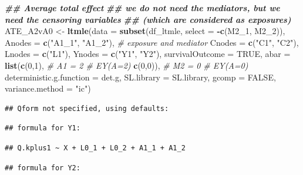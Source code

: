 \documentclass[
]{book}
\newenvironment{Shaded}{\begin{snugshade}}{\end{snugshade}}
\newcommand{\AttributeTok}[1]{\textcolor[rgb]{0.13,0.29,0.53}{#1}}
\newcommand{\CommentTok}[1]{\textcolor[rgb]{0.56,0.35,0.01}{\textit{#1}}}
\newcommand{\ConstantTok}[1]{\textcolor[rgb]{0.56,0.35,0.01}{#1}}
\newcommand{\DecValTok}[1]{\textcolor[rgb]{0.00,0.00,0.81}{#1}}
\newcommand{\DocumentationTok}[1]{\textcolor[rgb]{0.56,0.35,0.01}{\textbf{\textit{#1}}}}
\newcommand{\FunctionTok}[1]{\textcolor[rgb]{0.13,0.29,0.53}{\textbf{#1}}}
\newcommand{\NormalTok}[1]{#1}
\newcommand{\OtherTok}[1]{\textcolor[rgb]{0.56,0.35,0.01}{#1}}
\newcommand{\SpecialCharTok}[1]{\textcolor[rgb]{0.81,0.36,0.00}{\textbf{#1}}}
\newcommand{\StringTok}[1]{\textcolor[rgb]{0.31,0.60,0.02}{#1}}
\begin{document}
\begin{Shaded}
\begin{Highlighting}[]
\DocumentationTok{\#\# Average total effect}
\DocumentationTok{\#\# we do not need the mediators, but we need the censoring variables}
\DocumentationTok{\#\# (which are considered as exposures)}
\NormalTok{ATE\_A2vA0 }\OtherTok{\textless{}{-}} \FunctionTok{ltmle}\NormalTok{(}\AttributeTok{data =} \FunctionTok{subset}\NormalTok{(df\_ltmle, }\AttributeTok{select =} \SpecialCharTok{{-}}\FunctionTok{c}\NormalTok{(M2\_1, M2\_2)),}
                      \AttributeTok{Anodes =} \FunctionTok{c}\NormalTok{(}\StringTok{"A1\_1"}\NormalTok{, }\StringTok{"A1\_2"}\NormalTok{), }\CommentTok{\# exposure and mediator}
                      \AttributeTok{Cnodes =} \FunctionTok{c}\NormalTok{(}\StringTok{"C1"}\NormalTok{, }\StringTok{"C2"}\NormalTok{),}
                      \AttributeTok{Lnodes =} \FunctionTok{c}\NormalTok{(}\StringTok{"L1"}\NormalTok{),}
                      \AttributeTok{Ynodes =} \FunctionTok{c}\NormalTok{(}\StringTok{"Y1"}\NormalTok{, }\StringTok{"Y2"}\NormalTok{),}
                      \AttributeTok{survivalOutcome =} \ConstantTok{TRUE}\NormalTok{,}
                      \AttributeTok{abar =} \FunctionTok{list}\NormalTok{(}\FunctionTok{c}\NormalTok{(}\DecValTok{0}\NormalTok{,}\DecValTok{1}\NormalTok{), }\CommentTok{\# A1 = 2 \# EY(A=2)}
                                  \FunctionTok{c}\NormalTok{(}\DecValTok{0}\NormalTok{,}\DecValTok{0}\NormalTok{)), }\CommentTok{\# M2 = 0 \# EY(A=0)}
                      \AttributeTok{deterministic.g.function =}\NormalTok{ det.g,}
                      \AttributeTok{SL.library =}\NormalTok{ SL.library,}
                      \AttributeTok{gcomp =} \ConstantTok{FALSE}\NormalTok{,}
                      \AttributeTok{variance.method =} \StringTok{"ic"}\NormalTok{)}
\end{Highlighting}
\end{Shaded}

\begin{verbatim}
## Qform not specified, using defaults:
\end{verbatim}

\begin{verbatim}
## formula for Y1:
\end{verbatim}

\begin{verbatim}
## Q.kplus1 ~ X + L0_1 + L0_2 + A1_1 + A1_2
\end{verbatim}

\begin{verbatim}
## formula for Y2:
\end{verbatim}
\end{document}
